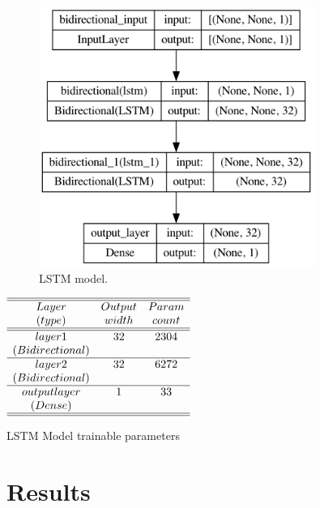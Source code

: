 \documentclass[twoside]{article}
\begin{document}
\begin{figure}
\centering
\includegraphics[width=0.8\textwidth]{2.png}
\caption[]{ 
  LSTM model. 
  }
\vspace{1mm}
\label{z2}
\end{figure}

\begin{table}
\centering \(\begin{array}{cccccccccccc}

\hline
\hline
 Layer      &Output  &Param    \\
 (type)    &  width& count \\
\hline
\hline
layer 1            &32   &     2304     \\ 
 (Bidirectional)      &  & \     \\                                                    
\hline
layer 2            &32          &    6272      \\
 (Bidirectional)                 &  & \\                                                                                                    
 \hline
output layer   &    1          &      33        \\
 (Dense)                 &  & \\                                                                                                    
\hline
\hline
\end{array}\)
\caption{LSTM Model trainable parameters }
\label{tab:model}
\end{table}

\section{\label{sec3}Results}
\end{document}
